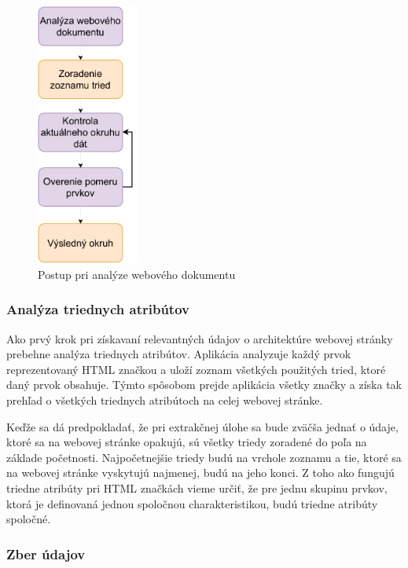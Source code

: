  \begin{figure}[hbt]
	\centering
	\includegraphics[width=0.3\textwidth]{obrazky-figures/analysis.pdf}
	\caption{Postup pri analýze webového dokumentu}
	\label{analysispdf}
\end{figure}

\newpage

\subsubsection{Analýza triednych atribútov}

Ako prvý krok pri získavaní relevantných údajov o architektúre webovej stránky prebehne analýza triednych atribútov. Aplikácia analyzuje každý prvok reprezentovaný HTML značkou a uloží zoznam všetkých použitých tried, ktoré daný prvok obsahuje. Týmto spôsobom prejde aplikácia všetky značky a získa tak prehľad o všetkých triednych atribútoch na celej webovej stránke.

Keďže sa dá predpokladať, že pri extrakčnej úlohe sa bude zväčša jednať o údaje, ktoré sa na webovej stránke opakujú, sú všetky triedy zoradené do poľa na základe početnosti. Najpočetnejšie triedy budú na vrchole zoznamu a tie, ktoré sa na webovej stránke vyskytujú najmenej, budú na jeho konci. Z toho ako fungujú triedne atribúty pri HTML značkách vieme určiť, že pre jednu skupinu prvkov, ktorá je definovaná jednou spoločnou charakteristikou, budú triedne atribúty spoločné. 


\subsubsection{Zber údajov}

